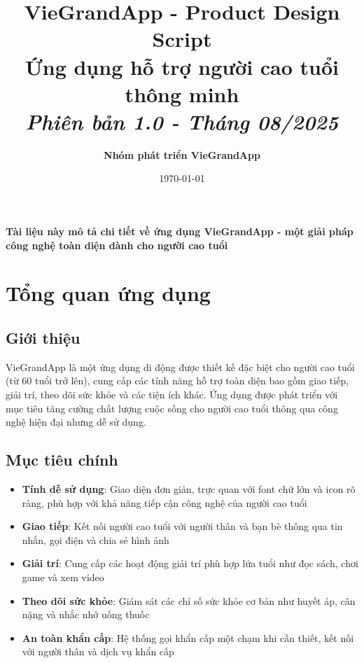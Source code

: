 \documentclass[12pt,a4paper]{article}
\title{\textbf{VieGrandApp - Product Design Script}\\
\large Ứng dụng hỗ trợ người cao tuổi thông minh\\
\vspace{0.5cm}
\large \textit{Phiên bản 1.0 - Tháng 08/2025}}
\author{\textbf{Nhóm phát triển VieGrandApp}}
\date{\today}
\begin{document}
\maketitle

\begin{center}
\vspace{1cm}
\textbf{\large Tài liệu này mô tả chi tiết về ứng dụng VieGrandApp - một giải pháp công nghệ toàn diện dành cho người cao tuổi}
\vspace{1cm}
\end{center}

\tableofcontents
\newpage

\section{Tổng quan ứng dụng}

\subsection{Giới thiệu}
VieGrandApp là một ứng dụng di động được thiết kế đặc biệt cho người cao tuổi (từ 60 tuổi trở lên), cung cấp các tính năng hỗ trợ toàn diện bao gồm giao tiếp, giải trí, theo dõi sức khỏe và các tiện ích khác. Ứng dụng được phát triển với mục tiêu tăng cường chất lượng cuộc sống cho người cao tuổi thông qua công nghệ hiện đại nhưng dễ sử dụng.

\subsection{Mục tiêu chính}
\begin{itemize}[leftmargin=2cm]
    \item \textbf{Tính dễ sử dụng}: Giao diện đơn giản, trực quan với font chữ lớn và icon rõ ràng, phù hợp với khả năng tiếp cận công nghệ của người cao tuổi
    \item \textbf{Giao tiếp}: Kết nối người cao tuổi với người thân và bạn bè thông qua tin nhắn, gọi điện và chia sẻ hình ảnh
    \item \textbf{Giải trí}: Cung cấp các hoạt động giải trí phù hợp lứa tuổi như đọc sách, chơi game và xem video
    \item \textbf{Theo dõi sức khỏe}: Giám sát các chỉ số sức khỏe cơ bản như huyết áp, cân nặng và nhắc nhở uống thuốc
    \item \textbf{An toàn khẩn cấp}: Hệ thống gọi khẩn cấp một chạm khi cần thiết, kết nối với người thân và dịch vụ khẩn cấp
\end{itemize}
\end{document}

